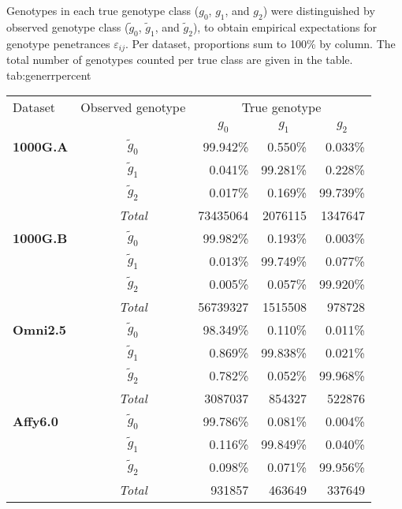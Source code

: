 

\begin{table}[tbp]
{Genotypes in each true genotype class ($g_0$, $g_1$, and $g_2$) were distinguished by observed genotype class ($\tilde{g}_0$, $\tilde{g}_1$, and $\tilde{g}_2$), to obtain empirical expectations for genotype penetrances $\varepsilon_{ij}$.
Per dataset, proportions sum to 100\% by column.
The total number of genotypes counted per true class are given in the table.}
{tab:generrpercent}
\centering
\begin{threeparttable}
\renewcommand{\arraystretch}{1.1}%
\begin{tabular}{lcrrr}
\toprule
 Dataset & Observed genotype & \multicolumn{3}{c}{True genotype} \\ \cmidrule(lr){3-5}
 & & \multicolumn{1}{c}{$g_0$} & \multicolumn{1}{c}{$g_1$} & \multicolumn{1}{c}{$g_2$} \\ \midrule
\textbf{1000G.A}
& $\tilde{g}_0$ & 99.942\% &  0.550\% &  0.033\% \\
& $\tilde{g}_1$ &  0.041\% & 99.281\% &  0.228\% \\
& $\tilde{g}_2$ &  0.017\% &  0.169\% & 99.739\% \\ \cmidrule(lr){2-5}
& \emph{Total} & \num{73435064} & \num{2076115} & \num{1347647} \\ \midrule
\textbf{1000G.B}
& $\tilde{g}_0$ & 99.982\% &  0.193\% &  0.003\% \\
& $\tilde{g}_1$ &  0.013\% & 99.749\% &  0.077\% \\
& $\tilde{g}_2$ &  0.005\% &  0.057\% & 99.920\% \\ \cmidrule(lr){2-5}
& \emph{Total} & \num{56739327} & \num{1515508} & \num{978728} \\ \midrule
\textbf{Omni2.5}
& $\tilde{g}_0$ & 98.349\% &  0.110\% &  0.011\% \\
& $\tilde{g}_1$ &  0.869\% & 99.838\% &  0.021\% \\
& $\tilde{g}_2$ &  0.782\% &  0.052\% & 99.968\% \\ \cmidrule(lr){2-5}
& \emph{Total} & \num{3087037} & \num{854327} & \num{522876} \\ \midrule
\textbf{Affy6.0}
& $\tilde{g}_0$ & 99.786\% &  0.081\% &  0.004\% \\
& $\tilde{g}_1$ &  0.116\% & 99.849\% &  0.040\% \\
& $\tilde{g}_2$ &  0.098\% &  0.071\% & 99.956\% \\ \cmidrule(lr){2-5}
& \emph{Total} &  \num{931857} & \num{463649} & \num{337649} \\ \bottomrule
\end{tabular}



\end{threeparttable}
\end{table}
